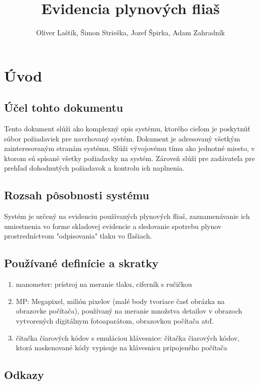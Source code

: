 \documentclass{zah}
\title{Evidencia plynových fliaš}
\author{Oliver Laštík, Šimon Strieška, Jozef Špirka, Adam Zahradník}
\begin{document}
\maketitle

\tableofcontents
\cleardoublepage

\section{Úvod}

\subsection{Účel tohto dokumentu}

Tento dokument slúži ako komplexný opis systému, ktorého cieľom je poskytnúť súbor požiadaviek pre navrhovaný systém. Dokument je adresovaný všetkým zainteresovaným stranám systému. Slúži vývojovému tímu ako jednotné miesto, v ktorom sú spísané všetky požiadavky na systém. Zároveň slúži pre zadávateľa pre prehľad dohodnutých požiadavok a kontrolu ich naplnenia.

\subsection{Rozsah pôsobnosti systému}

Systém je určený na evidenciu používaných plynových fliaš, zaznamenávanie ich umiestnenia vo forme skladovej evidencie a sledovanie spotrebu plynov prostredníctvom "odpisovania" tlaku vo fľašiach.

\subsection{Používané definície a skratky}

\begin{enumerate}
	\item manometer: prístroj na meranie tlaku, ciferník s ručičkou
 	\item MP: Megapixel, milión pixelov (malé body tvoriace časť obrázka na obrazovke počítača), používaný na meranie množstva detailov v obrazoch vytvorených digitálnym fotoaparátom, obrazovkou počítača atď.
 	\item čítačka čiarových kódov s emuláciou klávesnice: čítačka čiarových kódov, ktorá naskenované kódy vypisuje na klávesnicu pripojeného počítača
\end{enumerate}

\subsection{Odkazy}
\end{document}
